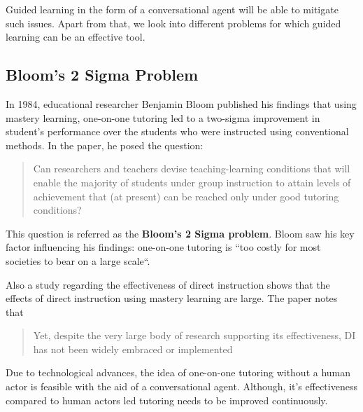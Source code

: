 \documentclass[]{article}
\begin{document}
Guided learning in the form of a conversational agent will be able to mitigate such issues. Apart from that, we look into different problems for which guided learning can be an effective tool.
\subsection[Bloom's 2 Sigma]{Bloom's 2 Sigma Problem}
In 1984, educational researcher Benjamin Bloom published his findings\cite{doi:10.3102/0013189X013006004} that using mastery learning, one-on-one tutoring led to a two-sigma improvement in student's performance over the students who were instructed using conventional methods.  In the paper, he posed the question: 
\begin{quote}
  Can researchers and teachers devise teaching-learning conditions that will enable the majority of students under group instruction to attain levels of achievement that (at present) can be reached only under good tutoring conditions?
\end{quote}
This question is referred as the \textbf{Bloom's 2 Sigma problem}. Bloom saw his key factor influencing his findings: one-on-one tutoring is “too costly for most societies to bear on a large scale“.  

Also a study regarding the effectiveness of direct instruction \cite{doi:10.3102/0034654317751919} shows that the effects of direct instruction using mastery learning are large. The paper notes that 
\begin{quote}
  Yet,  despite  the  very  large  
body of research supporting its effectiveness, DI has not been widely embraced or 
implemented
\end{quote}

Due to technological advances, the idea of one-on-one tutoring without a human actor is feasible with the aid of a conversational agent. Although, it's effectiveness compared to human actors led tutoring needs to be improved continuously.
\end{document}
